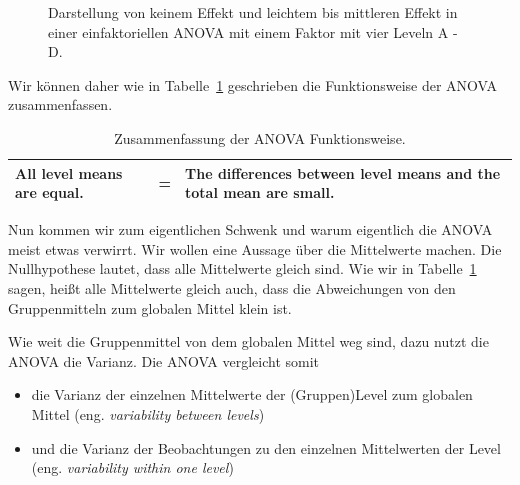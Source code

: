 \documentclass[
  letterpaper,
  DIV=11,
  oneside]{scrreport}
\providecommand{\tightlist}{%
  \setlength{\itemsep}{0pt}\setlength{\parskip}{0pt}}\usepackage{longtable,booktabs,array}
\begin{document}
\begin{figure}
\begin{minipage}[t]{0.50\linewidth}
{{}

}

\end{minipage}%

\caption{\label{fig-anova-exp-6}Darstellung von keinem Effekt und
leichtem bis mittleren Effekt in einer einfaktoriellen ANOVA mit einem
Faktor mit vier Leveln A - D.}

\end{figure}

Wir können daher wie in Tabelle~\ref{tbl-sum-anova-eff} geschrieben die
Funktionsweise der ANOVA zusammenfassen.

\hypertarget{tbl-sum-anova-eff}{}
\begin{longtable}[]{@{}
  >{\centering\arraybackslash}p{}
  >{\centering\arraybackslash}p{}
  >{\centering\arraybackslash}p{}@{}}
\caption{\label{tbl-sum-anova-eff}Zusammenfassung der ANOVA
Funktionsweise.}\tabularnewline
\toprule()
\endhead
All level means are equal. & = & The differences between level means and
the total mean are small. \\
\bottomrule()
\end{longtable}

Nun kommen wir zum eigentlichen Schwenk und warum eigentlich die ANOVA
meist etwas verwirrt. Wir wollen eine Aussage über die Mittelwerte
machen. Die Nullhypothese lautet, dass alle Mittelwerte gleich sind. Wie
wir in Tabelle~\ref{tbl-sum-anova-eff} sagen, heißt alle Mittelwerte
gleich auch, dass die Abweichungen von den Gruppenmitteln zum globalen
Mittel klein ist.

Wie weit die Gruppenmittel von dem globalen Mittel weg sind, dazu nutzt
die ANOVA die Varianz. Die ANOVA vergleicht somit

\begin{itemize}
\tightlist
\item
  die Varianz der einzelnen Mittelwerte der (Gruppen)Level zum globalen
  Mittel (eng. \emph{variability between levels})
\item
  und die Varianz der Beobachtungen zu den einzelnen Mittelwerten der
  Level (eng. \emph{variability within one level})
\end{itemize}

{}
\end{document}
